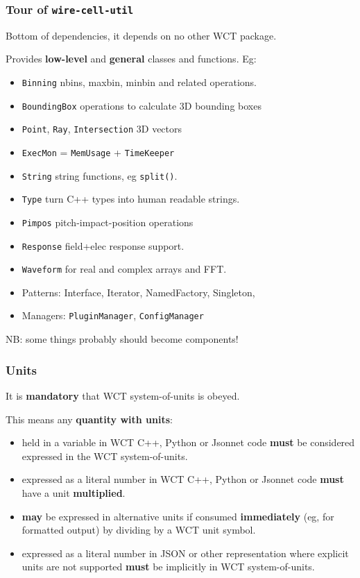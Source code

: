 \documentclass[xcolor=dvipsnames]{beamer}
\begin{document}
\begin{frame}
  \tableofcontents[
  currentsection,
  currentsubsection,        
  subsectionstyle=show/shaded/hide]
\end{frame}

\begin{frame}
  \frametitle{Tour of \texttt{wire-cell-util}}

  Bottom of dependencies, it depends on no other WCT package.

  Provides \textbf{low-level} and \textbf{general} classes and
  functions.   Eg:

  \footnotesize
  \begin{itemize}
  \item\texttt{Binning} nbins, maxbin, minbin and related operations.
  \item\texttt{BoundingBox} operations to calculate 3D bounding boxes
  \item\texttt{Point}, \texttt{Ray}, \texttt{Intersection} 3D vectors
  \item\texttt{ExecMon} = \texttt{MemUsage} + \texttt{TimeKeeper}
  \item\texttt{String} string functions, eg \texttt{split()}.
  \item\texttt{Type} turn C++ types into human readable strings.
  \item\texttt{Pimpos} pitch-impact-position operations
  \item\texttt{Response} field+elec response support.
  \item \texttt{Waveform} for real and complex arrays and FFT.
  \item Patterns: Interface, Iterator, NamedFactory, Singleton, 
  \item Managers: \texttt{PluginManager}, \texttt{ConfigManager}
  \end{itemize}
  
  NB: some things probably should become components!
\end{frame}


\begin{frame}
  \frametitle{Units}
  It is \textbf{mandatory} that WCT system-of-units is obeyed.

  This means any \textbf{quantity with units}:
  \begin{itemize}
  \item held in a variable in WCT C++, Python or Jsonnet code
    \textbf{must} be considered expressed in the WCT system-of-units.
  \item expressed as a literal number in WCT C++,
    Python or Jsonnet code \textbf{must} have a unit \textbf{multiplied}.
  \item \textbf{may} be expressed in alternative units if consumed
    \textbf{immediately} (eg, for formatted output) by dividing by a
    WCT unit symbol.
  \item expressed as a literal number in JSON or other representation
    where explicit units are not supported \textbf{must} be implicitly
    in WCT system-of-units.
  \end{itemize}
\end{frame}
\end{document}
